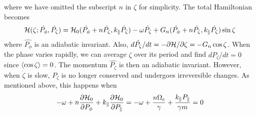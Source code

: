 where we have omitted the subscript $n$ in $\zeta$ for simplicity. The total Hamiltonian becomes
\begin{equation}
    \mathcal{H}(\zeta;\hat{P_\phi},\hat{P_\zeta})=\mathcal{H}_0(\hat{P_\phi}+n\hat{P_\zeta},k_\|\hat{P_\zeta})-\omega\hat{P_\zeta}+G_n(\hat{P_\phi}+n\hat{P_\zeta},k_\|\hat{P_\zeta})\sin\zeta
\end{equation}
where $\hat{P_\phi}$ is an adiabatic invariant. Also,
$d\hat{P_\zeta}/dt=-\partial\mathcal{H}/\partial\zeta=-G_n\cos\zeta$.
When the phase varies rapidly, we can average $\zeta$ over its period and find
$d\hat{P_\zeta}/dt=0$ since $\expval{\cos\zeta}=0$. The momentum $\hat{P_\zeta}$
is then an adiabatic invariant. However, when $\dot\zeta$ is slow, $P_\zeta$ is
no longer conserved and undergoes irreversible changes. As mentioned above, this
happens when
\begin{equation}
    -\omega+n\frac{\partial\mathcal{H}_0}{\partial
    P_\phi}+k_\|\frac{\partial\mathcal{H}_0}{\partial P_\|}
    =-\omega+\frac{n\Omega_c}{\gamma}+\frac{k_\|P_\|}{\gamma m}=0
\end{equation}
